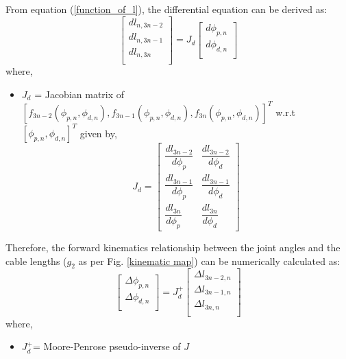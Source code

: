 \documentclass[a4paper,12pt]{report}
\begin{document}
From equation (\ref{function_of_l}), the differential equation can be derived as: 
\begin{equation*}
\begin{bmatrix}
dl_{n,3n-2}\\
dl_{n,3n-1}\\
dl_{n,3n}\\
\end{bmatrix} = J_{d}
\begin{bmatrix}
d\phi_{p,n}\\
d\phi_{d,n}\\
\end{bmatrix}
\label{differential_of_l}
\end{equation*}
where,
\begin{itemize}
	\renewcommand\labelitemi{--}
	\item $J_{d}$ = Jacobian matrix of $[f_{3n-2}(\phi_{p,n},\phi_{d,n}),f_{3n-1}(\phi_{p,n},\phi_{d,n}),f_{3n}(\phi_{p,n},\phi_{d,n})]^{T}$ w.r.t $[\phi_{p,n},\phi_{d,n}]^{T}$ given by, 
	\begingroup
	\renewcommand{\arraystretch}{1.5}
	\begin{equation*}
	J_{d} = 
	\begin{bmatrix}
	\dfrac{dl_{3n-2}}{d\phi_{p}} & \dfrac{dl_{3n-2}}{d\phi_{d}} \\
	\dfrac{dl_{3n-1}}{d\phi_{p}} & \dfrac{dl_{3n-1}}{d\phi_{d}}\\
	\dfrac{dl_{3n}}{d\phi_{p}} & \dfrac{dl_{3n}}{d\phi_{d}}
	\end{bmatrix}
	\end{equation*}
	\endgroup
\end{itemize}

Therefore, the forward kinematics relationship between the joint angles and the cable lengths ($g_{2}$ as per Fig. \ref{kinematic map}) can be numerically calculated as:
\begin{equation}
\begin{bmatrix}
\Delta \phi_{p,n}\\
\Delta \phi_{d,n}\\
\end{bmatrix}
= J_{d}^{+}
\begin{bmatrix}
\Delta l_{3n-2,n}\\
\Delta l_{3n-1,n}\\
\Delta l_{3n,n}\\
\end{bmatrix}
\label{g2}
\end{equation}
where,
\begin{itemize}
	\renewcommand\labelitemi{--}
	\item $J_{d}^{+}$= Moore-Penrose pseudo-inverse of $J$
\end{itemize}
\end{document}

